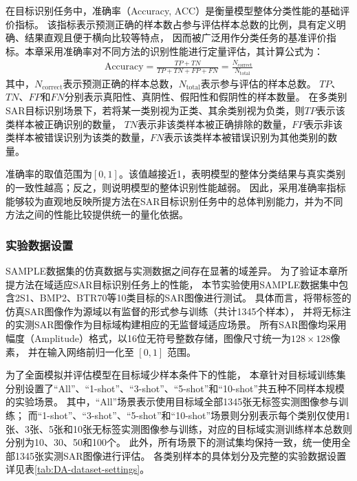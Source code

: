 在目标识别任务中，准确率（Accuracy, ACC）是衡量模型整体分类性能的基础评价指标。
该指标表示预测正确的样本数占参与评估样本总数的比例，具有定义明确、结果直观且便于横向比较等特点，
因而被广泛用作分类任务的基准评价指标。本章采用准确率对不同方法的识别性能进行定量评估，其计算公式为：
\begin{gather}
\text{Accuracy} = \frac{TP + TN}{TP + TN + FP + FN} = \frac{N_{\text{correct}}}{N_{\text{total}}}
\end{gather}
其中，$N_{\text{correct}}$表示预测正确的样本总数，$N_{\text{total}}$表示参与评估的样本总数。
$TP$、$TN$、$FP$和$FN$分别表示真阳性、真阴性、假阳性和假阴性的样本数量。
在多类别SAR目标识别场景下，若将某一类别视为正类、其余类别视为负类，则$TP$表示该类样本被正确识别的数量，
$TN$表示非该类样本被正确排除的数量，$FP$表示非该类样本被错误识别为该类的数量，$FN$表示该类样本被错误识别为其他类别的数量。

准确率的取值范围为$[0,1]$。该值越接近1，表明模型的整体分类结果与真实类别的一致性越高；反之，则说明模型的整体识别性能越弱。
因此，采用准确率指标能够较为直观地反映所提方法在SAR目标识别任务中的总体判别能力，并为不同方法之间的性能比较提供统一的量化依据。







\subsubsection{实验数据设置}

SAMPLE数据集的仿真数据与实测数据之间存在显著的域差异。
为了验证本章所提方法在域适应SAR目标识别任务上的性能，
本节实验使用SAMPLE数据集中包含2S1、BMP2、BTR70等10类目标的SAR图像进行测试。
具体而言，将带标签的仿真SAR图像作为源域以有监督的形式参与训练（共计1345个样本），
并将无标注的实测SAR图像作为目标域构建相应的无监督域适应场景。
所有SAR图像均采用幅度（Amplitude）格式，以16位无符号整数存储，图像尺寸统一为$128 \times 128$像素，
并在输入网络前归一化至 $[0, 1]$ 范围。

为了全面模拟并评估模型在目标域少样本条件下的性能，
本章针对目标域训练集分别设置了“All”、“1-shot”、“3-shot”、“5-shot”和“10-shot”共五种不同样本规模的实验场景。
其中，“All”场景表示使用目标域全部1345张无标签实测图像参与训练；
而“1-shot”、“3-shot”、“5-shot”和“10-shot”场景则分别表示每个类别仅使用1张、3张、5张和10张无标签实测图像参与训练，对应的目标域实测训练样本总数则分别为10、30、50和100个。
此外，所有场景下的测试集均保持一致，统一使用全部1345张实测SAR图像进行评估。
各类别样本的具体划分及完整的实验数据设置详见表\ref{tab:DA-dataset-settings}。




